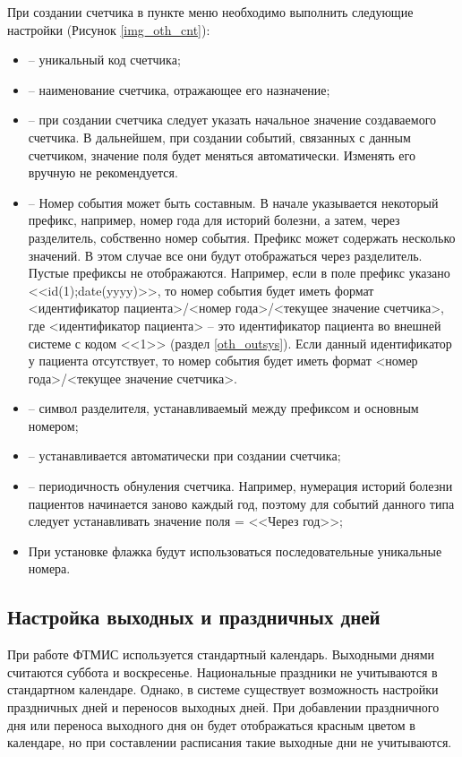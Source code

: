 При создании счетчика в пункте меню  необходимо выполнить следующие настройки (Рисунок \ref{img_oth_cnt}):
\begin{itemize}
 \item {} – уникальный код счетчика;
 \item {} – наименование счетчика, отражающее его назначение;
 \item {} – при создании счетчика следует указать начальное значение создаваемого счетчика. В дальнейшем, при создании событий, связанных с данным счетчиком, значение поля будет меняться автоматически. Изменять его вручную не рекомендуется.
 \item {} – Номер события может быть составным. В начале указывается некоторый префикс, например, номер года для историй болезни, а затем, через разделитель, собственно номер события. Префикс может содержать несколько значений. В этом случае все они будут отображаться через разделитель. Пустые префиксы не отображаются. Например, если в поле префикс указано <<id(1);date(yyyy)>>, то номер события будет иметь формат <идентификатор пациента>/<номер года>/<текущее значение счетчика>, где <идентификатор пациента> – это идентификатор пациента во внешней системе с кодом <<1>> (раздел \ref{oth_outsys}). Если данный идентификатор у пациента отсутствует, то номер события будет иметь формат <номер года>/<текущее значение счетчика>.
 \item {} – символ разделителя, устанавливаемый между префиксом и основным номером;
 \item {} – устанавливается автоматически при создании счетчика;
 \item {} – периодичность обнуления счетчика. Например, нумерация историй болезни пациентов начинается заново каждый год, поэтому для событий данного типа следует устанавливать значение поля  = <<Через год>>;
 \item При установке флажка  будут использоваться последовательные уникальные номера.
\end{itemize}

\subsection{Настройка выходных и праздничных дней}

При работе ФТМИС используется стандартный календарь. Выходными днями считаются суббота и воскресенье. Национальные праздники не учитываются в стандартном календаре. Однако, в системе существует возможность настройки праздничных дней и переносов выходных дней. При добавлении праздничного дня или переноса выходного дня он будет отображаться красным цветом в календаре, но при составлении расписания такие выходные дни не учитываются.

